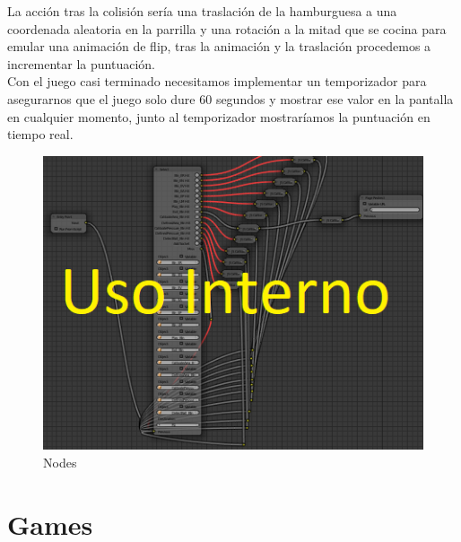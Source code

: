 \documentclass{article}
\begin{document}
La acción tras la colisión sería una traslación de la hamburguesa a una coordenada aleatoria en la parrilla y una rotación a la mitad que se cocina para emular una animación de flip, tras la animación y la traslación procedemos a incrementar la puntuación.
\\
Con el juego casi terminado necesitamos implementar un temporizador para asegurarnos que el juego solo dure 60 segundos y mostrar ese valor en la pantalla en cualquier momento, junto al temporizador mostraríamos la puntuación en tiempo real.
\\
\begin{figure}[h]
    \centering
    \includegraphics[scale=1.25]{Nodos.PNG}
    \caption{Nodes}
    \label{nodos}
\end{figure}
\section{Games}
\end{document}
